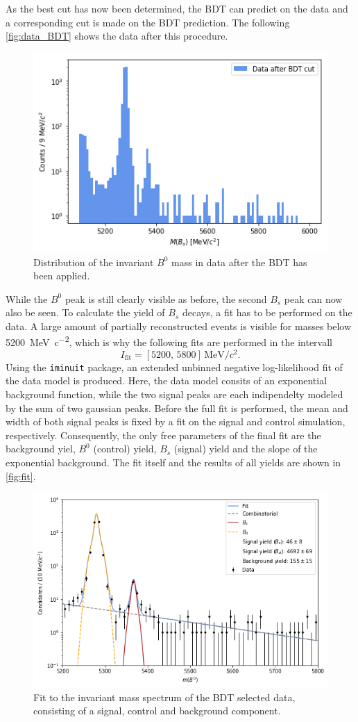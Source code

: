 As the best cut has now been determined, the BDT can predict on the data and a corresponding cut is made on the BDT prediction. The following \autoref{fig:data_BDT} shows the
data after this procedure.
\begin{figure}[H]
	\centering
	\includegraphics[width=0.5\linewidth]{plots/data_BDT.png}
	\caption{Distribution of the invariant $B^0$ mass in data after the BDT has been applied.}
	\label{fig:data_BDT}
\end{figure}
While the $B^0$ peak is still clearly visible as before, the second $B_s$ peak can now also be seen.
To calculate the yield of $B_s$ decays, a fit has to be performed on the data.
A large amount of partially reconstructed events is visible for masses below \qty{5200}{\mega\electronvolt\per c^2}, which is why the following fits are performed in the intervall
\begin{equation*}
    I_\text{fit} = [5200, \, 5800] \, \si{\mega\electronvolt\per c^2}.
\end{equation*}
Using the \texttt{iminuit} \cite{iminuit} package, an extended unbinned negative log-likelihood fit of the data model is produced. Here, the data model consits of an
exponential background function, while the two signal peaks are each indipendelty modeled by the sum of two gaussian peaks. Before the full fit is performed, the mean and width
of both signal peaks is fixed by a fit on the signal and control simulation, respectively. Consequently, the only free parameters of the final fit are the background yiel,
$B^0$ (control) yield, $B_s$ (signal) yield and the slope of the exponential background. The fit itself and the results of all yields are shown in \autoref{fig:fit}.
\begin{figure}[H]
	\centering
	\includegraphics[width=0.7\linewidth]{plots/data_fit.png}
	\caption{Fit to the invariant mass spectrum of the BDT selected data, consisting of a signal, control and background component.}
	\label{fig:fit}
\end{figure}
